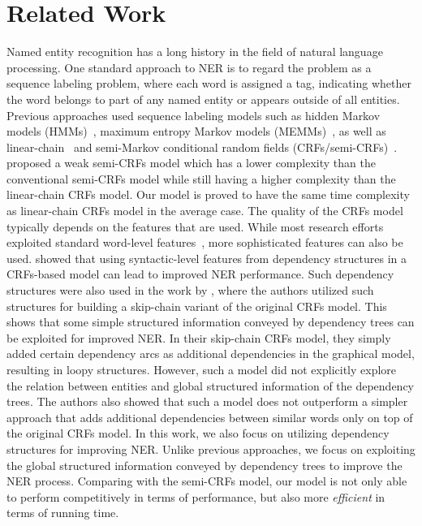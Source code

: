 \section{Related Work}
Named entity recognition has a long history in the field of natural language processing. 
One standard approach to NER is to regard the problem as a sequence labeling problem,
where each word is assigned a tag, indicating whether the word belongs to part of any named entity or appears outside of all entities.
Previous approaches used sequence labeling models such as hidden Markov models (HMMs)~\cite{zhou2002named}, maximum entropy Markov models (MEMMs)~\cite{mccallum2000maximum}, as well as linear-chain~\cite{finkel2005incorporating} and semi-Markov conditional random fields (CRFs/semi-CRFs)~\cite{sarawagi2004semi}. 
\citet{muis2016weak} proposed a weak semi-CRFs model which has a lower complexity than the conventional semi-CRFs model while still having a higher complexity than the linear-chain CRFs model. 
Our model is proved to have the same time complexity as linear-chain CRFs model in the average case. 
The quality of the CRFs model typically depends on the features that are used.
While most research efforts exploited standard word-level features~\cite{ratinov2009design}, more sophisticated features can also be used. 
\citet{ling2012fine} showed that using syntactic-level features from dependency structures in a CRFs-based model can lead to improved NER performance.
Such dependency structures were also used in the work by \citet{liu2010recognizing},
where the authors utilized such structures for building a skip-chain variant of the original CRFs model.
This shows that some simple structured information conveyed by dependency trees can be exploited for improved NER. 
In their skip-chain CRFs model, they simply added certain dependency arcs as additional dependencies in the graphical model, resulting in loopy structures.
However, such a model did not explicitly explore the relation between entities and global structured information of the dependency trees.
The authors also showed that such a model does not outperform a simpler approach that adds additional dependencies between similar words only on top of the original CRFs model.
%
In this work, we also focus on utilizing dependency structures for improving NER.
Unlike previous approaches, we focus on exploiting the global structured information conveyed by dependency trees to improve the NER process. Comparing with the semi-CRFs model, our  model is not only able to perform competitively in terms of performance, but also more {\em efficient} in terms of running time.

